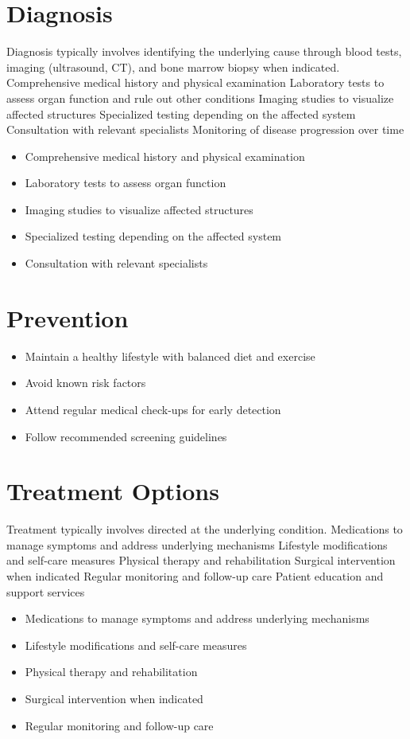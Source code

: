\section{Diagnosis}
Diagnosis typically involves identifying the underlying cause through blood tests, imaging (ultrasound, CT), and bone marrow biopsy when indicated. Comprehensive medical history and physical examination Laboratory tests to assess organ function and rule out other conditions Imaging studies to visualize affected structures Specialized testing depending on the affected system Consultation with relevant specialists Monitoring of disease progression over time

\begin{itemize}[noitemsep]
  \item Comprehensive medical history and physical examination
  \item Laboratory tests to assess organ function
  \item Imaging studies to visualize affected structures
  \item Specialized testing depending on the affected system
  \item Consultation with relevant specialists
\end{itemize}
\section{Prevention}
\begin{itemize}[noitemsep]
  \item Maintain a healthy lifestyle with balanced diet and exercise
  \item Avoid known risk factors
  \item Attend regular medical check-ups for early detection
  \item Follow recommended screening guidelines
\end{itemize}
\section{Treatment Options}
Treatment typically involves directed at the underlying condition. Medications to manage symptoms and address underlying mechanisms Lifestyle modifications and self-care measures Physical therapy and rehabilitation Surgical intervention when indicated Regular monitoring and follow-up care Patient education and support services

\begin{itemize}[noitemsep]
  \item Medications to manage symptoms and address underlying mechanisms
  \item Lifestyle modifications and self-care measures
  \item Physical therapy and rehabilitation
  \item Surgical intervention when indicated
  \item Regular monitoring and follow-up care
\end{itemize}
